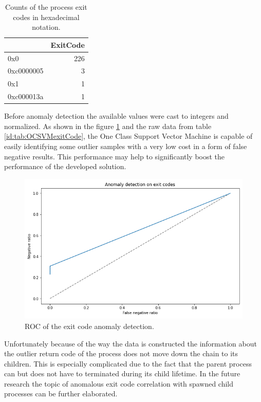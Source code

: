\documentclass[a4paper,twoside,12pt]{book}
\begin{document}
\begin{table}
	\centering
	\caption{Counts of the process exit codes in hexadecimal notation.}
	\label{id:tab:exitCodeCounts}
	\begin{tabular}{lr}
		\toprule
		{} &  ExitCode \\
		\midrule
		0x0        &       226 \\
		0xc0000005 &         3 \\
		0x1        &         1 \\
		0xc000013a &         1 \\
		\bottomrule
	\end{tabular}		
\end{table}

Before anomaly detection the available values were cast to integers and normalized.
As shown in the figure \ref{fig:exitCodeROC} and the raw data from table \ref{id:tab:OCSVMexitCode},  
the One Class Support Vector Machine is capable of easily identifying some outlier 
samples with a very low cost in a form of false negative results. This performance may help to
significantly boost the performance of the developed solution. 

\begin{figure}
	\centering
	\includegraphics[scale=0.9]{images/ExitCodeROC}
	\caption{ROC of the exit code anomaly detection.}
	\label{fig:exitCodeROC}
 \end{figure}

Unfortunately because of the way the data is constructed the information about the outlier return code of the 
process does not move down the chain to its children. This is especially complicated due to the fact that the parent process
can but does not have to terminated during its child lifetime. In the future research the topic of anomalous exit
code correlation with spawned child processes can be further elaborated.
\end{document}
